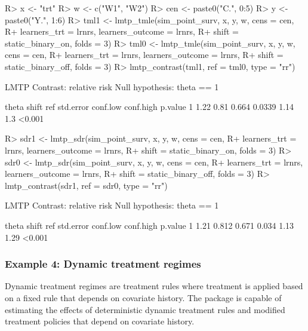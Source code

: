 \documentclass[]{jss}
\begin{document}
\begin{CodeChunk}

\begin{CodeInput}
R> x <- "trt"
R> w <- c("W1", "W2")
R> cen <- paste0("C.", 0:5)
R> y <- paste0("Y.", 1:6)
R> tml1 <- lmtp_tmle(sim_point_surv, x, y, w, cens = cen, 
R+                   learners_trt = lrnrs, learners_outcome = lrnrs,
R+                   shift = static_binary_on, folds = 3)
R> tml0 <- lmtp_tmle(sim_point_surv, x, y, w, cens = cen, 
R+                   learners_trt = lrnrs, learners_outcome = lrnrs,
R+                   shift = static_binary_off, folds = 3)
R> lmtp_contrast(tml1, ref = tml0, type = "rr")
\end{CodeInput}

\begin{CodeOutput}
  LMTP Contrast: relative risk
Null hypothesis: theta == 1

  theta shift   ref std.error conf.low conf.high p.value
1  1.22  0.81 0.664    0.0339     1.14       1.3  <0.001
\end{CodeOutput}

\begin{CodeInput}
R> sdr1 <- lmtp_sdr(sim_point_surv, x, y, w, cens = cen, 
R+                 learners_trt = lrnrs, learners_outcome = lrnrs,
R+                 shift = static_binary_on, folds = 3)
R> sdr0 <- lmtp_sdr(sim_point_surv, x, y, w, cens = cen, 
R+                 learners_trt = lrnrs, learners_outcome = lrnrs,
R+                 shift = static_binary_off, folds = 3)
R> lmtp_contrast(sdr1, ref = sdr0, type = "rr")
\end{CodeInput}

\begin{CodeOutput}
  LMTP Contrast: relative risk
Null hypothesis: theta == 1

  theta shift   ref std.error conf.low conf.high p.value
1  1.21 0.812 0.671     0.034     1.13      1.29  <0.001
\end{CodeOutput}

\end{CodeChunk}

\hypertarget{example-4-dynamic-treatment-regimes}{%
\subsubsection{Example 4: Dynamic treatment regimes}\label{example-4-dynamic-treatment-regimes}}

Dynamic treatment regimes are treatment rules where treatment is applied based on a fixed rule that depends on covariate history. The  package is capable of estimating the effects of deterministic dynamic treatment rules and modified treatment policies that depend on covariate history. 
\end{document}

